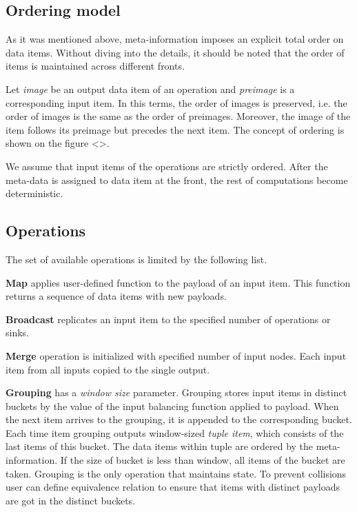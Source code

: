 \subsection{Ordering model}

As it was mentioned above, meta-information imposes an explicit total order on data items. Without diving into the details, it should be noted that the order of items is maintained across different fronts.

Let {\it image} be an output data item of an operation and {\it preimage} is a corresponding input item. In this terms, the order of images is preserved, i.e. the order of images is the same as the order of preimages. Moreover, the image of the item follows its preimage but precedes the next item. The concept of ordering is shown on the figure <>.

We assume that input items of the operations are strictly ordered. After the meta-data is assigned to data item at the front, the rest of computations become deterministic.

\subsection{Operations}

The set of available operations is limited by the following list.

{\bf Map} applies user-defined function to the payload of an input item. This function returns a sequence of data items with new payloads.

{\bf Broadcast} replicates an input item to the specified number of operations or sinks. 

{\bf Merge} operation is initialized with specified number of input nodes. Each input item from all inputs copied to the single output.

{\bf Grouping} has a {\it window size} parameter. Grouping stores input items in distinct buckets by the value of the input balancing function applied to payload. When the next item arrives to the grouping, it is appended to the corresponding bucket. Each time item grouping outputs window-sized {\it tuple item}, which consists of the last items of this bucket. The data items within tuple are ordered by the meta-information. If the size of bucket is less than window, all items of the bucket are taken. Grouping is the only operation that maintains state. To prevent collisions user can define equivalence relation to ensure that items with distinct payloads are got in the distinct buckets.

